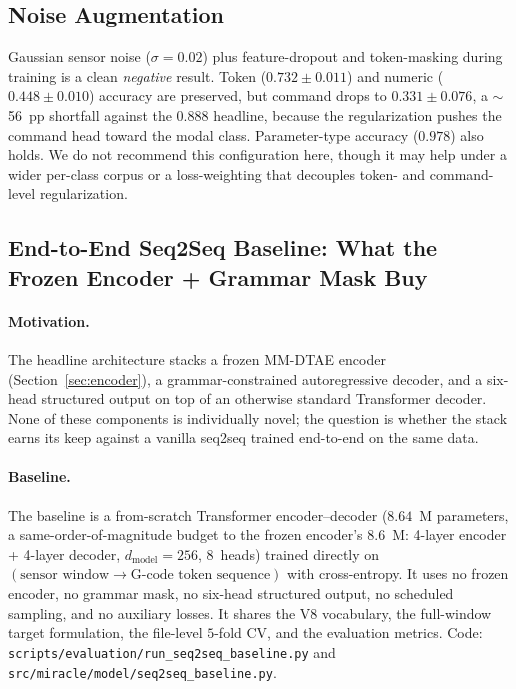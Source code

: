 \documentclass[sensors,article,submit,moreauthors,pdftex]{Definitions/mdpi}
\begin{document}
\subsection{Noise Augmentation}
\label{sec:noise-aug}

Gaussian sensor noise ($\sigma=0.02$) plus feature-dropout and token-masking during training is a clean \emph{negative} result. Token ($0.732 \pm 0.011$) and numeric ($0.448 \pm 0.010$) accuracy are preserved, but command drops to $0.331 \pm 0.076$, a $\sim$56~pp shortfall against the $0.888$ headline, because the regularization pushes the command head toward the modal class. Parameter-type accuracy ($0.978$) also holds. We do not recommend this configuration here, though it may help under a wider per-class corpus or a loss-weighting that decouples token- and command-level regularization.

\subsection{End-to-End Seq2Seq Baseline: What the Frozen Encoder + Grammar Mask Buy}
\label{sec:abl-seq2seq-baseline}

\paragraph{Motivation.} The headline architecture stacks a frozen MM-DTAE encoder (Section~\ref{sec:encoder}), a grammar-constrained autoregressive decoder, and a six-head structured output on top of an otherwise standard Transformer decoder. None of these components is individually novel; the question is whether the stack earns its keep against a vanilla seq2seq trained end-to-end on the same data.

\paragraph{Baseline.} The baseline is a from-scratch Transformer encoder--decoder ($8.64$~M parameters, a same-order-of-magnitude budget to the frozen encoder's $8.6$~M: 4-layer encoder + 4-layer decoder, $d_{\text{model}}\!=\!256$, $8$~heads) trained directly on $(\text{sensor window}\!\to\!\text{G-code token sequence})$ with cross-entropy. It uses no frozen encoder, no grammar mask, no six-head structured output, no scheduled sampling, and no auxiliary losses. It shares the V8 vocabulary, the full-window target formulation, the file-level $5$-fold CV, and the evaluation metrics. Code: \texttt{scripts/evaluation/run\_seq2seq\_baseline.py} and \texttt{src/miracle/model/seq2seq\_baseline.py}.
\end{document}
